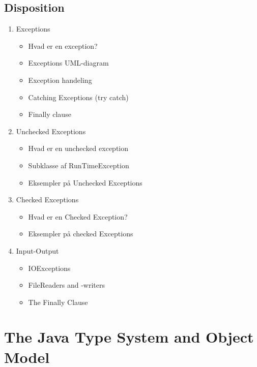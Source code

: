 \documentclass{article}
\begin{document}
\newpage
\subsection{Disposition}
\begin{enumerate}
	\item Exceptions
	\begin{itemize}
		\item Hvad er en exception?
		\item Exceptions UML-diagram
		\item Exception handeling 
		\item Catching Exceptions (try catch)
		\item Finally clause 
	\end{itemize}
	\item Unchecked Exceptions
	\begin{itemize}
		\item Hvad er en unchecked exception
		\item Subklasse af RunTimeException
		\item Eksempler på Unchecked Exceptions
	\end{itemize}
	\item Checked Exceptions
	\begin{itemize}
		\item Hvad er en Checked Exception?
		\item Eksempler på checked Exceptions
	\end{itemize}
	\item Input-Output 
	\begin{itemize}
		\item IOExceptions 
		\item FileReaders and -writers
		\item The Finally Clause
	\end{itemize}
	
\end{enumerate}
\newpage

\section{The Java Type System and Object Model}
\end{document}

